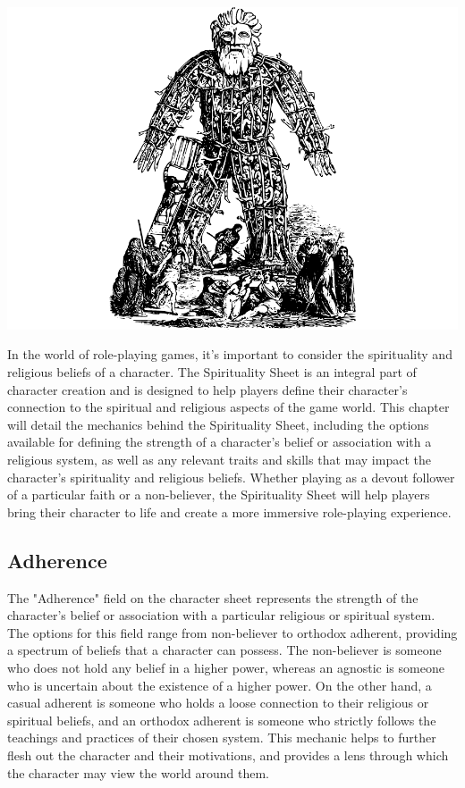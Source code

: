 \documentclass[12pt]{book}
\begin{document}
\begin{center}
    \includegraphics[width=\textwidth]{./images/religion01.pdf}
\end{center}

In the world of role-playing games, it's important to consider the spirituality and religious beliefs of a character. The Spirituality Sheet is an integral part of character creation and is designed to help players define their character's connection to the spiritual and religious aspects of the game world. This chapter will detail the mechanics behind the Spirituality Sheet, including the options available for defining the strength of a character's belief or association with a religious system, as well as any relevant traits and skills that may impact the character's spirituality and religious beliefs. Whether playing as a devout follower of a particular faith or a non-believer, the Spirituality Sheet will help players bring their character to life and create a more immersive role-playing experience.

\subsection{\textbf{Adherence}}

The "Adherence" field on the character sheet represents the strength of the character's belief or association with a particular religious or spiritual system. The options for this field range from non-believer to orthodox adherent, providing a spectrum of beliefs that a character can possess. The non-believer is someone who does not hold any belief in a higher power, whereas an agnostic is someone who is uncertain about the existence of a higher power. On the other hand, a casual adherent is someone who holds a loose connection to their religious or spiritual beliefs, and an orthodox adherent is someone who strictly follows the teachings and practices of their chosen system. This mechanic helps to further flesh out the character and their motivations, and provides a lens through which the character may view the world around them.
\end{document}
